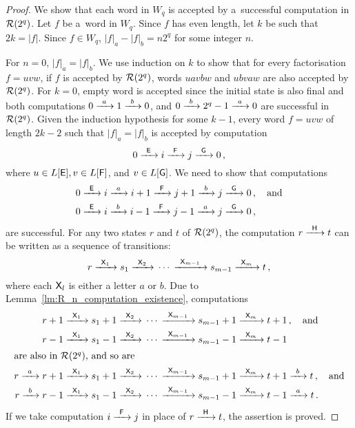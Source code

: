 \begin{proof}
    We show that each word in $W_q$ is accepted by a~successful computation in $\aut{R}(2^q)$. Let $f$ be a~word in $W_q$. Since $f$ has even length, let $k$ be such that $2k = |f|$. Since $f \in W_q$, $|f|_a - |f|_b = n 2^q$ for some integer $n$.

    For $n=0$, $|f|_a = |f|_b$. We use induction on $k$ to show that for every factorisation $f = uvw$, if $f$ is accepted by $\aut{R}(2^q)$, words $uavbw$ and $ubvaw$ are also accepted by $\aut{R}(2^q)$. For $k = 0$, empty word is accepted since the initial state is also final and both computations $0 \tr{a} 1 \tr{b} 0$, and $0 \tr{b} 2^q-1 \tr{a} 0$ are successful in $\aut{R}(2^q)$. Given the induction hypothesis for some $k - 1$, every word $f = uvw$ of length $2k - 2$ such that $|f|_a = |f|_b$ is accepted by computation
    \[
        0 \tr{\re{E}} i \tr{\re{F}} j \tr{\re{G}} 0 \, ,
    \]
    where $u \in L[\re{E}], v \in L[\re{F}]$, and $v \in L[\re{G}]$. We need to show that computations
    \begin{align*}
        0 &\tr{\re{E}} i \tr{a} i+1 \tr{\re{F}} j+1 \tr{b} j \tr{\re{G}} 0 \, , \quad \text{and} \\
        0 &\tr{\re{E}} i \tr{b} i-1 \tr{\re{F}} j-1 \tr{a} j \tr{\re{G}} 0 \, ,
    \end{align*}
    are successful. For any two states $r$ and $t$ of $\aut{R}(2^q)$, the computation $r \tr{\re{H}} t$ can be written as a sequence of transitions:
    \[
        r \tr{\re{X}_1} s_1 \tr{\re{X}_2} \dotsb \tr{\re{X}_{m-1}} s_{m-1} \tr{\re{X}_m} t \, ,
    \]
    where each $\re{X}_l$ is either a letter $a$ or $b$. Due to Lemma~\ref*{lm:R_n_computation_existence}, computations
    \begin{align*}
        r + 1 &\tr{\re{X}_1} s_1 + 1 \tr{\re{X}_2} \dotsb \tr{\re{X}_{m-1}} s_{m-1} + 1 \tr{\re{X}_m} t + 1 \, , \quad \text{and} \\
        r - 1 &\tr{\re{X}_1} s_1 - 1 \tr{\re{X}_2} \dotsb \tr{\re{X}_{m-1}} s_{m-1} - 1 \tr{\re{X}_m} t - 1 \\
    \intertext{are also in $\aut{R}(2^q)$, and so are}
        r \tr{a} r + 1 &\tr{\re{X}_1} s_1 + 1 \tr{\re{X}_2} \dotsb \tr{\re{X}_{m-1}} s_{m-1} + 1 \tr{\re{X}_m} t + 1 \tr{b} t \, , \quad \text{and} \\
        r \tr{b} r - 1 &\tr{\re{X}_1} s_1 - 1 \tr{\re{X}_2} \dotsb \tr{\re{X}_{m-1}} s_{m-1} - 1 \tr{\re{X}_m} t - 1 \tr{a} t \, .
    \end{align*}
    If we take computation $i \tr{\re{F}} j$ in place of $r \tr{\re{H}} t$, the assertion is proved.


\end{proof}
